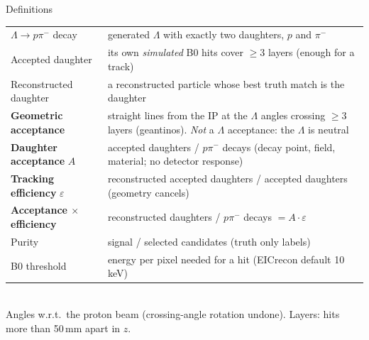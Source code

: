 \documentclass[aspectratio=169,10pt]{beamer}
\begin{document}
\begin{frame}{Definitions}
\small
\begin{tabular}{@{}p{}p{}@{}}
\toprule
$\Lambda\to p\pi^-$ decay & generated $\Lambda$ with exactly two daughters, $p$ and $\pi^-$ \\
Accepted daughter & its own \emph{simulated} B0 hits cover $\ge 3$ layers (enough for a track)\\
Reconstructed daughter & a reconstructed particle whose best truth match is the daughter\\
\midrule
\textbf{Geometric acceptance} & straight lines from the IP at the $\Lambda$ angles crossing $\ge 3$ layers (geantinos). \emph{Not} a $\Lambda$ acceptance: the $\Lambda$ is neutral\\
\textbf{Daughter acceptance} $A$ & accepted daughters / $p\pi^-$ decays (decay point, field, material; no detector response)\\
\textbf{Tracking efficiency} $\varepsilon$ & reconstructed accepted daughters / accepted daughters (geometry cancels)\\
\textbf{Acceptance $\times$ efficiency} & reconstructed daughters / $p\pi^-$ decays $= A\cdot\varepsilon$\\
\midrule
Purity & signal / selected candidates (truth only labels)\\
B0 threshold & energy per pixel needed for a hit (EICrecon default 10\,keV)\\
\bottomrule
\end{tabular}
\vspace{1mm}\\
\footnotesize Angles w.r.t.\ the proton beam (crossing-angle rotation undone). Layers: hits more than 50\,mm apart in $z$.
\end{frame}
\end{document}
